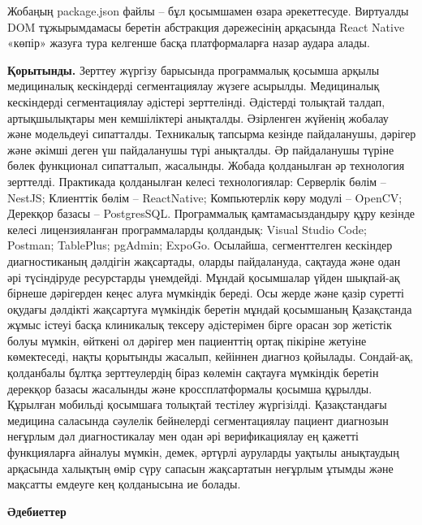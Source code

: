 \begin{multicols}{2}


Жобаңың package.json файлы -- бұл қосымшамен өзара әрекеттесуде.
Виртуалды DOM тұжырымдамасы беретін абстракция дәрежесінің арқасында
React Native «көпір» жазуға тура келгенше басқа платформаларға назар
аудара алады.

{\bfseries Қорытынды.} Зерттеу жүргізу барысында программалық қосымша
арқылы медициналық кескіндерді сегментациялау жүзеге асырылды.
Медициналық кескіндерді сегментациялау әдістері зерттелінді. Әдістерді
толықтай талдап, артықшылықтары мен кемшіліктері анықталды. Әзірленген
жүйенің жобалау және модельдеуі сипатталды. Техникалық тапсырма кезінде
пайдаланушы, дәрігер және әкімші деген үш пайдаланушы түрі анықталды. Әр
пайдаланушы түріне бөлек функционал сипатталып, жасалынды. Жобада
қолданылған әр технология зерттелді. Практикада қолданылған келесі
технологиялар: Серверлік бөлім -- NestJS; Клиенттік бөлім --
ReactNative; Компьютерлік көру модулі -- OpenCV; Дерекқор базасы --
PostgresSQL. Программалық қамтамасыздандыру құру кезінде келесі
лицензияланған программаларды қолдандық: Visual Studio Code; Postman;
TablePlus; pgAdmin; ExpoGo. Осылайша, сегменттелген кескіндер
диагностиканың дәлдігін жақсартады, оларды пайдалануда, сақтауда және
одан әрі түсіндіруде ресурстарды үнемдейді. Мұндай қосымшалар үйден
шықпай-ақ бірнеше дәрігерден кеңес алуға мүмкіндік береді. Осы жерде
және қазір суретті оқудағы дәлдікті жақсартуға мүмкіндік беретін мұндай
қосымшаның Қазақстанда жұмыс істеуі басқа клиникалық тексеру әдістерімен
бірге орасан зор жетістік болуы мүмкін, өйткені ол дәрігер мен
пациенттің ортақ пікіріне жетуіне көмектеседі, нақты қорытынды жасалып,
кейіннен диагноз қойылады. Сондай-ақ, қолданбалы бұлтқа зерттеулердің
біраз көлемін сақтауға мүмкіндік беретін дерекқор базасы жасалынды және
кроссплатформалы қосымша құрылды. Құрылған мобильді қосымшаға толықтай
тестілеу жүргізілді. Қазақстандағы медицина саласында сәулелік
бейнелерді сегментациялау пациент диагнозын неғұрлым дәл диагностикалау
мен одан әрі верификациялау ең қажетті функцияларға айналуы мүмкін,
демек, әртүрлі ауруларды уақтылы анықтаудың арқасында халықтың өмір сүру
сапасын жақсартатын неғұрлым ұтымды және мақсатты емдеуге кең
қолданысына ие болады.
\end{multicols}

\begin{center}
  {\bfseries Әдебиеттер}
  \end{center}


